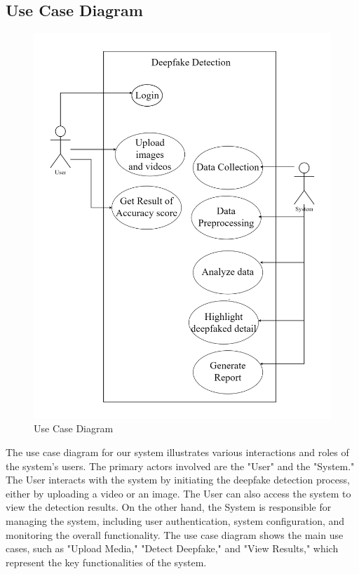 
\subsection{Use Case Diagram}
\begin{figure}[h]
    \centering
    \includegraphics[width= 5in ]{img/usecasediagram.drawio.png}
    \caption{Use Case Diagram}
\end{figure}
\justify
The use case diagram for our system illustrates various interactions and roles of the system's users. The primary actors involved are the "User" and the "System." The User interacts with the system by initiating the deepfake detection process, either by uploading a video or an image. The User can also access the system to view the detection results. On the other hand, the System is responsible for managing the system, including user authentication, system configuration, and monitoring the overall functionality. The use case diagram shows the main use cases, such as "Upload Media," "Detect Deepfake," and "View Results," which represent the key functionalities of the system.